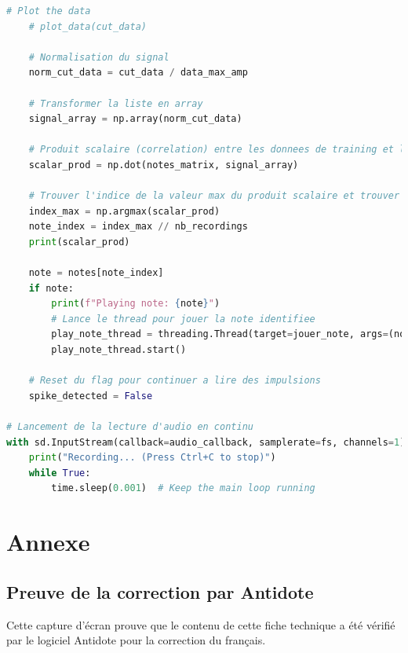 ﻿\documentclass[11pt,letterpaper]{article}
\begin{document}
\begin{lstlisting}[language=python]
    # Plot the data
    # plot_data(cut_data)

    # Normalisation du signal
    norm_cut_data = cut_data / data_max_amp

    # Transformer la liste en array
    signal_array = np.array(norm_cut_data)

    # Produit scalaire (correlation) entre les donnees de training et le signal test
    scalar_prod = np.dot(notes_matrix, signal_array)

    # Trouver l'indice de la valeur max du produit scalaire et trouver sa note correspondante
    index_max = np.argmax(scalar_prod)
    note_index = index_max // nb_recordings
    print(scalar_prod)

    note = notes[note_index]
    if note:
        print(f"Playing note: {note}")
        # Lance le thread pour jouer la note identifiee
        play_note_thread = threading.Thread(target=jouer_note, args=(note,))
        play_note_thread.start()
    
    # Reset du flag pour continuer a lire des impulsions
    spike_detected = False

# Lancement de la lecture d'audio en continu
with sd.InputStream(callback=audio_callback, samplerate=fs, channels=1):
    print("Recording... (Press Ctrl+C to stop)")
    while True:
        time.sleep(0.001)  # Keep the main loop running
\end{lstlisting}

\clearpage
\section{Annexe}

\subsection{Preuve de la correction par Antidote}

Cette capture d'écran prouve que le contenu de cette fiche technique a été vérifié par
le logiciel Antidote pour la correction du français.


\clearpage
\printbibliography
% 
% 
\end{document}
